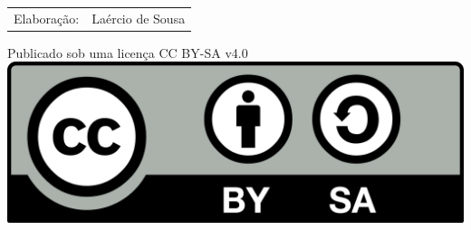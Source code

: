 \clearpage

\thispagestyle{empty}

\begin{center}
  \begin{tabular}{rl}
    Elaboração:       & Laércio de Sousa  \\
  \end{tabular}

  \vspace{1cm}

  Publicado sob uma licença CC BY-SA v4.0 \\[\baselineskip] \includegraphics[scale=0.07]{cc-by-sa-icon.png}
\end{center}